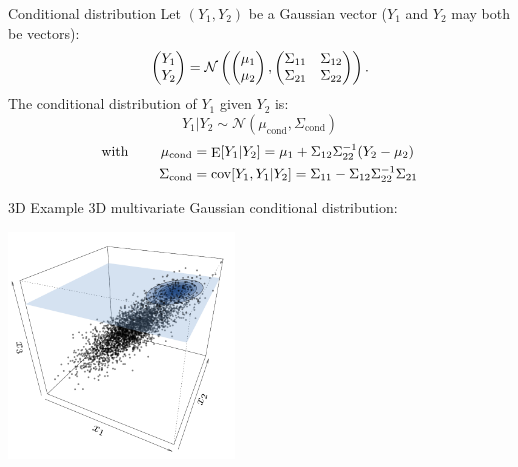 \documentclass{beamer}
\DeclareMathOperator*{\E}{E}
\DeclareMathOperator*{\Cov}{cov}
\begin{document}
\begin{frame}{}
\begin{block}{Conditional distribution}
Let $(Y_1,Y_2)$ be a Gaussian vector ($Y_1$ and $Y_2$ may both be vectors):
\begin{equation*}
\begin{pmatrix}
	Y_1\\
	Y_2\\
\end{pmatrix}
=
\mathcal{N}
\left(
\begin{pmatrix}
	\mu_1\\
	\mu_2\\
\end{pmatrix},
\begin{pmatrix}
	\Sigma_{11} & \Sigma_{12}\\
	\Sigma_{21} & \Sigma_{22}\\
\end{pmatrix}
\right).
\vspace{5mm}
\end{equation*}
The conditional distribution of $Y_1$ given $Y_2$ is:
 $$Y_1|Y_2 \sim \mathcal{N}(\mu_\mathrm{cond},\Sigma_\mathrm{cond})$$
\begin{equation*}
\begin{split}
	\text{with \qquad} \mu_\mathrm{cond} &= \E [Y_1|Y_2] = \mu_1 + \Sigma_{12} \Sigma_{22}^{-1} (Y_2-\mu_2)\\
	\Sigma_\mathrm{cond} &= \Cov [Y_1,Y_1|Y_2] = \Sigma_{11} - \Sigma_{12} \Sigma_{22}^{-1} \Sigma_{21}
\end{split}
\end{equation*}
\end{block}
\end{frame}

\begin{frame}{}
\begin{exampleblock}{3D Example}
3D multivariate Gaussian conditional distribution:\\
\begin{center}
\includegraphics[height=6cm]{figures/ch1_condpdf2}
\end{center}
\end{exampleblock}
\end{frame}
\end{document}
